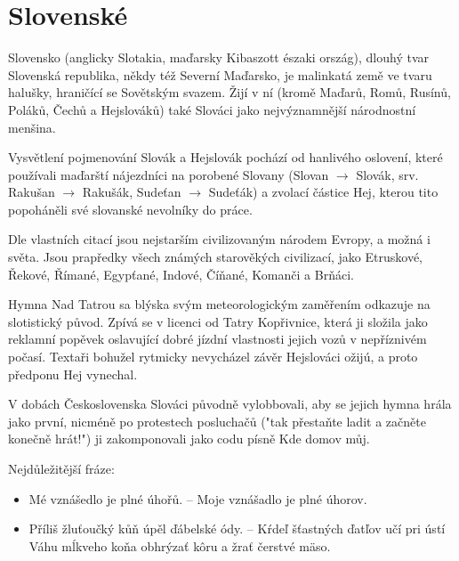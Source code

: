 \documentclass[10.5pt]{book}
\begin{document}

\section{Slovenské}

Slovensko (anglicky Slotakia, maďarsky Kibaszott északi ország), dlouhý tvar
Slovenská republika, někdy též Severní Maďarsko, je malinkatá země ve tvaru
halušky, hraničící se Sovětským svazem. Žijí v ní (kromě Maďarů, Romů, Rusínů,
Poláků, Čechů a Hejslováků) také Slováci jako nejvýznamnější národnostní
menšina. 

Vysvětlení pojmenování Slovák a Hejslovák pochází od hanlivého oslovení, které
používali maďarští nájezdníci na porobené Slovany (Slovan $\rightarrow$ Slovák,
srv. Rakušan $\rightarrow$ Rakušák, Sudeťan $\rightarrow$ Sudeťák) a zvolací
částice Hej, kterou tito popoháněli své slovanské nevolníky do práce. 

Dle vlastních citací jsou nejstarším civilizovaným národem Evropy, a možná
i světa. Jsou prapředky všech známých starověkých civilizací, jako Etruskové,
Řekové, Římané, Egypťané, Indové, Číňané, Komanči a Brňáci. 

Hymna Nad Tatrou sa blýska svým meteorologickým zaměřením odkazuje na
slotistický původ. Zpívá se v licenci od Tatry Kopřivnice, která ji složila
jako reklamní popěvek oslavující dobré jízdní vlastnosti jejich vozů
v nepříznivém počasí. Textaři bohužel rytmicky nevycházel závěr Hejslováci
ožijú, a proto předponu Hej vynechal. 

V dobách Československa Slováci původně vylobbovali, aby se jejich hymna hrála
jako první, nicméně po protestech posluchačů ("tak přestaňte ladit a začněte
konečně hrát!") ji zakomponovali jako codu písně Kde domov můj.

Nejdůležitější fráze:
\begin{itemize}
	\item Mé vznášedlo je plné úhořů. – Moje vznášadlo je plné úhorov.
    \item Příliš žluťoučký kůň úpěl ďábelské ódy. – Kŕdeľ šťastných ďatľov učí
    pri ústí Váhu mĺkveho koňa obhrýzať kôru a žrať čerstvé mäso. 
\end{itemize}
    

\newpage
\thispagestyle{empty}
\end{document}
